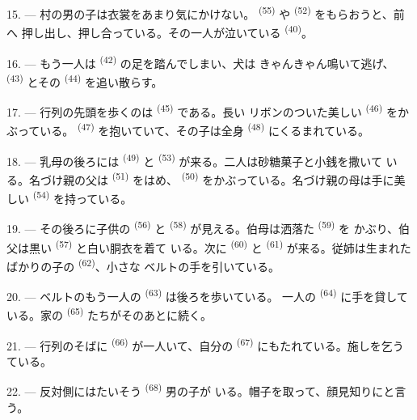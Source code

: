 15. --- 村の男の子は衣裳をあまり気にかけない。
\textsuperscript{(55)} や \textsuperscript{(52)} をもらおうと、前へ
押し出し、押し合っている。その一人が泣いている \textsuperscript{(40)}。

16. --- もう一人は \textsuperscript{(42)} の足を踏んでしまい、犬は
きゃんきゃん鳴いて逃げ、 \textsuperscript{(43)} とその
\textsuperscript{(44)} を追い散らす。

\VUsaut{5.0mm}
\VUsaut{4.0mm}

17. --- 行列の先頭を歩くのは \textsuperscript{(45)} である。長い
リボンのついた美しい \textsuperscript{(46)} をかぶっている。
 \textsuperscript{(47)} を抱いていて、その子は全身
 \textsuperscript{(48)} にくるまれている。

18. --- 乳母の後ろには \textsuperscript{(49)} と
 \textsuperscript{(53)} が来る。二人は砂糖菓子と小銭を撒いて
いる。名づけ親の父は \textsuperscript{(51)} をはめ、 \textsuperscript{(50)} をかぶっている。名づけ親の母は手に美しい
 \textsuperscript{(54)} を持っている。

19. --- その後ろに子供の \textsuperscript{(56)} と
\textsuperscript{(58)} が見える。伯母は洒落た \textsuperscript{(59)} を
かぶり、伯父は黒い \textsuperscript{(57)} と白い胴衣を着て
いる。次に \textsuperscript{(60)} と \textsuperscript{(61)}
が来る。従姉は生まれたばかりの子の \textsuperscript{(62)}、小さな
ベルトの手を引いている。

20. --- ベルトのもう一人の \textsuperscript{(63)} は後ろを歩いている。
一人の \textsuperscript{(64)} に手を貸している。家の
\textsuperscript{(65)} たちがそのあとに続く。

\VUsaut{4.6mm}
\VUsaut{3.4mm}

21. --- 行列のそばに \textsuperscript{(66)} が一人いて、自分の
 \textsuperscript{(67)} にもたれている。施しを乞うている。

22. --- 反対側にはたいそう \textsuperscript{(68)} 男の子が
いる。帽子を取って、顔見知りにと言う。

